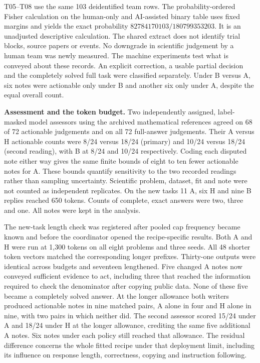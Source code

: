 \documentclass[11pt,a4paper]{article}
\newcommand{\lead}[1]{\textbf{#1}\enspace}
\begin{document}
T05--T08 use the same 103 deidentified team rows. The probability-ordered Fisher calculation on the human-only and AI-assisted binary table uses fixed margins and yields the exact probability \(82784170103/180799353203\). It is an unadjusted descriptive calculation. The shared extract does not identify trial blocks, source papers or events. No downgrade in scientific judgement by a human team was newly measured. The machine experiments test what is conveyed about these records. An explicit correction, a usable partial decision and the completely solved full task were classified separately. Under B versus A, six notes were actionable only under B and another six only under A, despite the equal overall count.

\lead{Assessment and the token budget.} Two independently assigned, label-masked model assessors using the archived mathematical references agreed on 68 of 72 actionable judgements and on all 72 full-answer judgements. Their A versus H actionable counts were 8/24 versus 18/24 (primary) and 10/24 versus 18/24 (second reading), with B at 8/24 and 10/24 respectively. Coding each disputed note either way gives the same finite bounds of eight to ten fewer actionable notes for A. These bounds quantify sensitivity to the two recorded readings rather than sampling uncertainty. Scientific problem, dataset, fit and note were not counted as independent replicates. On the new tasks 11 A, six H and nine B replies reached 650 tokens. Counts of complete, exact answers were two, three and one. All notes were kept in the analysis.

The new-task length check was registered after pooled cap frequency became known and before the coordinator opened the recipe-specific results. Both A and H were run at 1,300 tokens on all eight problems and three seeds. All 48 shorter token vectors matched the corresponding longer prefixes. Thirty-one outputs were identical across budgets and seventeen lengthened. Five changed A notes now conveyed sufficient evidence to act, including three that reached the information required to check the denominator after copying public data. None of these five became a completely solved answer. At the longer allowance both writers produced actionable notes in nine matched pairs, A alone in four and H alone in nine, with two pairs in which neither did. The second assessor scored 15/24 under A and 18/24 under H at the longer allowance, crediting the same five additional A notes. Six notes under each policy still reached that allowance. The residual difference concerns the whole fitted recipe under that deployment limit, including its influence on response length, correctness, copying and instruction following.
\end{document}
